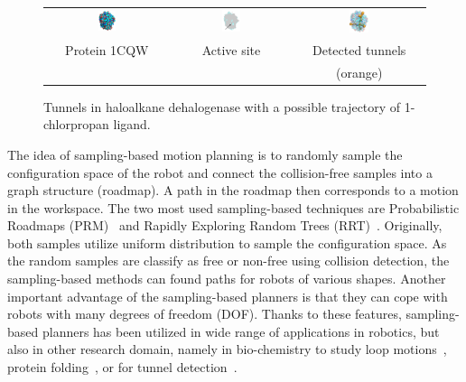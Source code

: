 \documentclass[letterpaper, 10 pt, conference]{ieeeconf} %
\begin{document}
\begin{figure}[b]
\centering
{\footnotesize
\renewcommand{\arraystretch}{0.1}
\renewcommand{\tabcolsep}{0pt}
\begin{tabular}{ccc}
\includegraphics[width=0.15\textwidth]{fig/motiv1} &
\includegraphics[width=0.17\textwidth]{fig/motiv2lab} &
\includegraphics[width=0.16\textwidth]{fig/motiv3}  \\
Protein 1CQW & Active site & Detected tunnels \\ %
             &            & (orange)          %
\end{tabular}
}
\caption{\label{fig::motiv}
    Tunnels in haloalkane dehalogenase with a possible trajectory of 1-chlorpropan ligand.
}
\end{figure}

The idea of sampling-based motion planning is to randomly sample the configuration space of the robot and connect the collision-free samples
into a graph structure (roadmap).
A path in the roadmap then corresponds to a motion in the workspace.
The two most used sampling-based techniques are Probabilistic Roadmaps (PRM)~\cite{kavrakiForPP} and Rapidly Exploring Random Trees (RRT)~\cite{lavalleRRT}.
Originally, both samples utilize uniform distribution to sample the configuration space.
As the random samples are classify as free or non-free using collision detection, the sampling-based methods can found paths for robots of various shapes. 
Another important advantage of the sampling-based planners is that they can cope with robots with many degrees of freedom (DOF).
Thanks to these features, sampling-based planners has been utilized in wide range of applications in robotics, but also in 
other research domain, namely in bio-chemistry 
to study loop motions~\cite{cortes2004geometric},
protein folding~\cite{raveh2009rapid,novinskaya2015improving},
or for tunnel detection~\cite{vonasek2017tunnel}.
\end{document}
